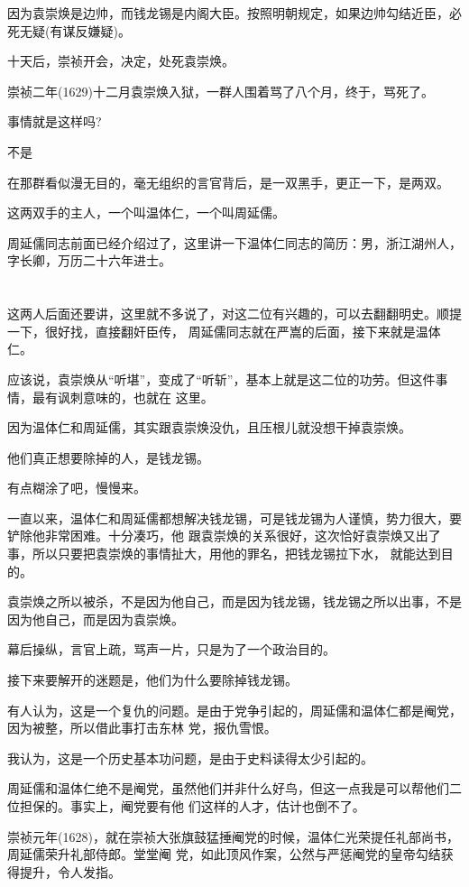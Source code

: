 \documentclass[11pt,a4paper,onecolumn]{article}
\begin{document}
因为袁崇焕是边帅，而钱龙锡是内阁大臣。按照明朝规定，如果边帅勾结近臣，必死无疑(有谋反嫌疑)。

十天后，崇祯开会，决定，处死袁崇焕。

崇祯二年(1629)十二月袁崇焕入狱，一群人围着骂了八个月，终于，骂死了。

事情就是这样吗?

不是

在那群看似漫无目的，毫无组织的言官背后，是一双黑手，更正一下，是两双。

这两双手的主人，一个叫温体仁，一个叫周延儒。

周延儒同志前面已经介绍过了，这里讲一下温体仁同志的简历：男，浙江湖州人，字长卿，万历二十六年进士。

\section[\thesection]{}

这两人后面还要讲，这里就不多说了，对这二位有兴趣的，可以去翻翻明史。顺提一下，很好找，直接翻奸臣传，
周延儒同志就在严嵩的后面，接下来就是温体仁。

应该说，袁崇焕从``听堪''，变成了``听斩''，基本上就是这二位的功劳。但这件事情，最有讽刺意味的，也就在
这里。

因为温体仁和周延儒，其实跟袁崇焕没仇，且压根儿就没想干掉袁崇焕。

他们真正想要除掉的人，是钱龙锡。

有点糊涂了吧，慢慢来。

一直以来，温体仁和周延儒都想解决钱龙锡，可是钱龙锡为人谨慎，势力很大，要铲除他非常困难。十分凑巧，他
跟袁崇焕的关系很好，这次恰好袁崇焕又出了事，所以只要把袁崇焕的事情扯大，用他的罪名，把钱龙锡拉下水，
就能达到目的。

袁崇焕之所以被杀，不是因为他自己，而是因为钱龙锡，钱龙锡之所以出事，不是因为他自己，而是因为袁崇焕。

幕后操纵，言官上疏，骂声一片，只是为了一个政治目的。

接下来要解开的迷题是，他们为什么要除掉钱龙锡。

有人认为，这是一个复仇的问题。是由于党争引起的，周延儒和温体仁都是阉党，因为被整，所以借此事打击东林
党，报仇雪恨。

我认为，这是一个历史基本功问题，是由于史料读得太少引起的。

周延儒和温体仁绝不是阉党，虽然他们并非什么好鸟，但这一点我是可以帮他们二位担保的。事实上，阉党要有他
们这样的人才，估计也倒不了。

崇祯元年(1628)，就在崇祯大张旗鼓猛捶阉党的时候，温体仁光荣提任礼部尚书，周延儒荣升礼部侍郎。堂堂阉
党，如此顶风作案，公然与严惩阉党的皇帝勾结获得提升，令人发指。
\end{document}
